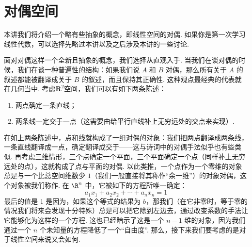 \chapter{对偶空间} \label{chap:对偶空间}

本讲我们将介绍一个略有些抽象的概念，即线性空间的对偶. 如果你是第一次学习线性代数，可以选择先略过本讲以及之后涉及本讲的一些讨论.

面对对偶这样一个全新且抽象的概念，我们选择从直观入手. 当我们在谈对偶的时候，我们在谈一种普遍性的结构：如果我们说 $A$ 和 $B$ 对偶，那么所有关于 $A$ 的叙述都能被翻译成关于 $B$ 的叙述，而且保持其正确性. 这种观点最经典的代表就在几何当中. 考虑$\mathbf{R}^2$空间，我们可以有如下两条陈述：
\begin{enumerate}
    \item 两点确定一条直线；
    \item 两条线一定交于一点（这需要由给平行直线补上无穷远处的交点来实现）.
\end{enumerate}
在如上两条陈述中，点和线就构成了一组对偶的对象：我们把两点翻译成两条线，一条直线翻译成一点，确定翻译成交于——这与诗词中的对偶手法似乎也有些类似. 再考虑三维情形，三个点确定一个平面，三个平面确定一个点（同样补上无穷远处的点），这就构成了点与平面的对偶. 以此类推，一个点作为一个零维的对象总是与一个比总空间维数少 $1$（我们一般直接将其称作“余一维”）的对象对偶，这个对象被我们称作. 在 $\R^n$ 中，它被如下的方程所唯一确定：
\[a_1 x_1 + a_2 x_2 + \cdots + a_n x_n = 1\]
最后的值是 $1$ 是因为，如果这个等式的结果为 $b$，那我们（在它非零时，等于零的情况我们将来会发现十分特殊）总是可以把它除到左边去，通过改变系数的手法让它能够化为这样的一个方程. 这也已经暗示了这是一个 $n - 1$ 维的对象，因为我们通过一个 $n$ 个未知量的方程降低了一个``自由度''. 那么，接下来我们要考虑的是对于线性空间来说又会如何.




